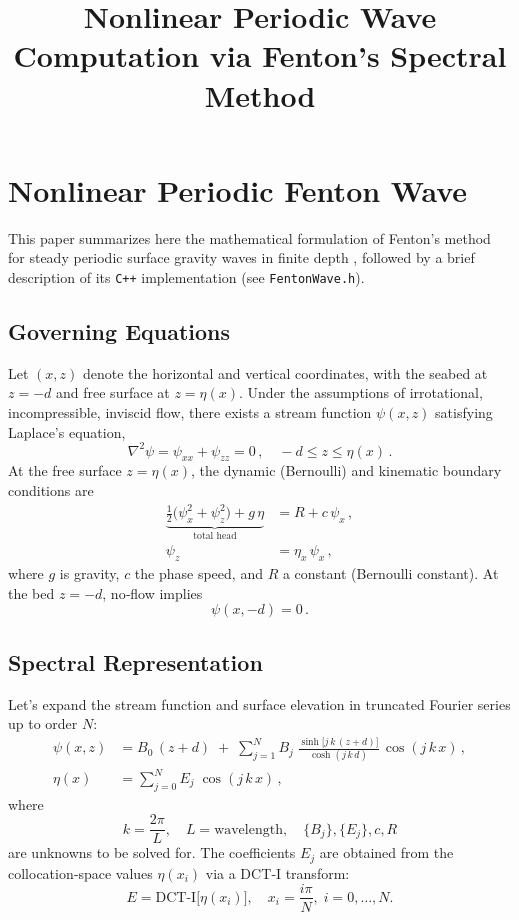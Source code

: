 \documentclass[11pt,letterpaper]{article}
\title{Nonlinear Periodic Wave Computation via Fenton’s Spectral Method}
\author{}
\date{}
\begin{document}
\maketitle

\section{Nonlinear Periodic Fenton Wave}
\label{sec:fenton_method}


This paper summarizes here the mathematical formulation of Fenton’s method for steady periodic surface gravity waves in finite depth \cite{Fenton1988}, followed by a brief description of its \verb|C++| implementation (see \texttt{FentonWave.h}).

\subsection{Governing Equations}

Let $(x,z)$ denote the horizontal and vertical coordinates, with the seabed at $z=-d$ and free surface at $z=\eta(x)$. Under the assumptions of irrotational, incompressible, inviscid flow, there exists a stream function $\psi(x,z)$ satisfying Laplace’s equation,
\begin{equation}
\nabla^2 \psi = \psi_{xx} + \psi_{zz} = 0\,, \quad -d \le z \le \eta(x)\,.
\end{equation}
At the free surface $z=\eta(x)$, the dynamic (Bernoulli) and kinematic boundary conditions are
\begin{align}
\underbrace{\tfrac12\bigl(\psi_x^2 + \psi_z^2\bigr) + g\,\eta}_{\text{total head}}
  &= R + c\,\psi_x\,, 
  \label{eq:bernoulli}\\
\psi_z &= \eta_x\,\psi_x\,,
  \label{eq:kinematic}
\end{align}
where $g$ is gravity, $c$ the phase speed, and $R$ a constant (Bernoulli constant). At the bed $z=-d$, no‐flow implies
\begin{equation}
\psi(x,-d)=0\,.
\end{equation}

\subsection{Spectral Representation}

Let's expand the stream function and surface elevation in truncated Fourier series up to order $N$:
\begin{align}
\psi(x,z) &= B_0\,(z + d)
   \;+\;\sum_{j=1}^{N} B_j\;\frac{\sinh\!\bigl[j\,k\,(z + d)\bigr]}{\cosh(j\,k\,d)}
   \,\cos(j\,k\,x)\,,
   \label{eq:psi_series}\\
\eta(x) &= \sum_{j=0}^{N} E_j\;\cos(j\,k\,x)\,,
   \label{eq:eta_series}
\end{align}
where
\[
k = \frac{2\pi}{L}, 
\quad L = \text{wavelength}, 
\quad \{B_j\},\{E_j\},c,R
\]
are unknowns to be solved for. The coefficients $E_j$ are obtained from the collocation‐space values $\eta(x_i)$ via a DCT‐I transform:
\[
E = \mathrm{DCT\text{-}I}\bigl[\eta(x_i)\bigr], 
\quad x_i = \frac{i\pi}{N},\; i=0,\dots,N.
\]
\end{document}
